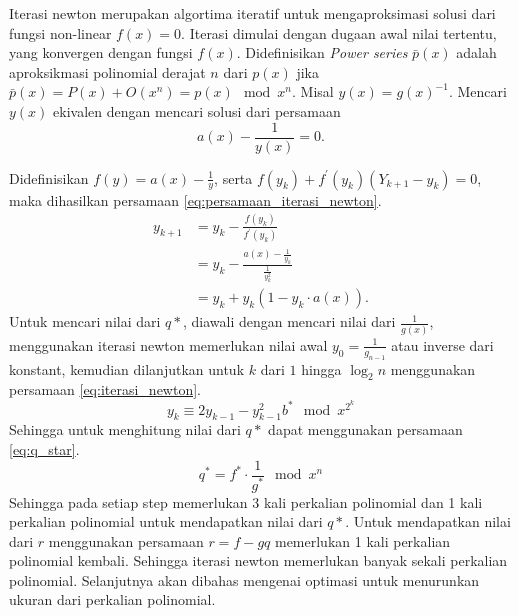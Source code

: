 Iterasi newton merupakan algortima iteratif untuk mengaproksimasi solusi dari fungsi non-linear $ f(x) = 0 $. Iterasi dimulai dengan dugaan awal nilai tertentu, yang konvergen dengan fungsi $ f(x) $. 
Didefinisikan \textit{Power series} $ \bar{p}(x) $ adalah aproksikmasi polinomial derajat $ n $ dari $ p(x) $ jika $ \bar{p}(x) = P(x) + O(x^n) = p(x) \mod{x^n} $. 
Misal $ y(x) = g(x)^{-1} $. Mencari $ y(x) $ ekivalen dengan mencari solusi dari persamaan $$ a(x) - \frac{1}{y(x)} = 0. $$

Didefinisikan $ f(y) = a(x) - \frac{1}{y} $, serta $ f(y_k) + f^{'}(y_k)(Y_{k+1} - y_k) = 0 $, maka dihasilkan persamaan \eqref{eq:persamaan_iterasi_newton}.
\begin{equation}
	\begin{aligned}
		y_{k+1} &= y_k - \frac{f(y_k)}{f^{'}(y_k)} \\
				&= y_k - \frac{a(x) - \frac{1}{y_k}}{\frac{1}{y_k^2}} \\
				&= y_k + y_k(1 - y_k \cdot a(x)).
	\end{aligned}
	\label{eq:persamaan_iterasi_newton}
\end{equation}
Untuk mencari nilai dari $ q* $, diawali dengan mencari nilai dari $ \frac{1}{g(x)} $, menggunakan iterasi newton memerlukan nilai awal $ y_0 = \frac{1}{g_{n-1}} $ atau inverse dari konstant, kemudian dilanjutkan untuk $ k $ dari $ 1 $ hingga $ \log_2 n $ menggunakan persamaan \eqref{eq:iterasi_newton}.
\begin{equation}
	y_k \equiv 2y_{k-1} - y_{k-1}^2 b^* \mod{x^{2^{k}}}
	\label{eq:iterasi_newton}
\end{equation}
Sehingga untuk menghitung nilai dari $ q* $ dapat menggunakan persamaan \eqref{eq:q_star}.
\begin{equation}
	q^* = f^* \cdot \frac{1}{g^*} \mod{x^n}
	\label{eq:q_star}
\end{equation}
Sehingga pada setiap step memerlukan 3 kali perkalian polinomial dan 1 kali perkalian polinomial untuk mendapatkan nilai dari $ q* $. Untuk mendapatkan nilai dari $ r $ menggunakan persamaan $ r = f-gq $ memerlukan 1 kali perkalian polinomial kembali. Sehingga iterasi newton memerlukan banyak sekali perkalian polinomial. Selanjutnya akan dibahas mengenai optimasi untuk menurunkan ukuran dari perkalian polinomial.

